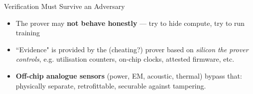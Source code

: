\documentclass[aspectratio=169]{beamer}
\begin{document}
\begin{frame}{Verification Must Survive an Adversary}
	\small
	\begin{itemize}\itemsep4pt
		\item The prover may \textbf{not behave honestly} --- try to hide compute, try to run training 
		\item ``Evidence" is provided by the (cheating?) prover based on \emph{silicon the
		prover controls}, e.g. utilisation counters, on-chip clocks, attested firmware, etc.
		\item \textbf{Off-chip analogue sensors} (power, EM, acoustic, thermal)
		bypass that: physically separate, retrofittable, securable against
		tampering.
	\end{itemize}
\end{frame}
\end{document}
